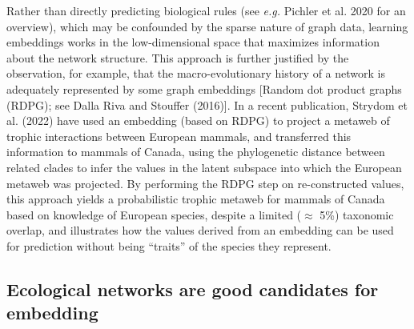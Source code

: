 \documentclass[
  letterpaper,
  DIV=11,
  numbers=noendperiod]{scrartcl}
\begin{document}
Rather than directly predicting biological rules (see \emph{e.g.}
Pichler et al. 2020 for an overview), which may be confounded by the
sparse nature of graph data, learning embeddings works in the
low-dimensional space that maximizes information about the network
structure. This approach is further justified by the observation, for
example, that the macro-evolutionary history of a network is adequately
represented by some graph embeddings {[}Random dot product graphs
(RDPG); see Dalla Riva and Stouffer (2016){]}. In a recent publication,
Strydom et al. (2022) have used an embedding (based on RDPG) to project
a metaweb of trophic interactions between European mammals, and
transferred this information to mammals of Canada, using the
phylogenetic distance between related clades to infer the values in the
latent subspace into which the European metaweb was projected. By
performing the RDPG step on re-constructed values, this approach yields
a probabilistic trophic metaweb for mammals of Canada based on knowledge
of European species, despite a limited (\(\approx\) 5\%) taxonomic
overlap, and illustrates how the values derived from an embedding can be
used for prediction without being ``traits'' of the species they
represent.

\hypertarget{ecological-networks-are-good-candidates-for-embedding}{%
\subsection{Ecological networks are good candidates for
embedding}\label{ecological-networks-are-good-candidates-for-embedding}}
\end{document}
